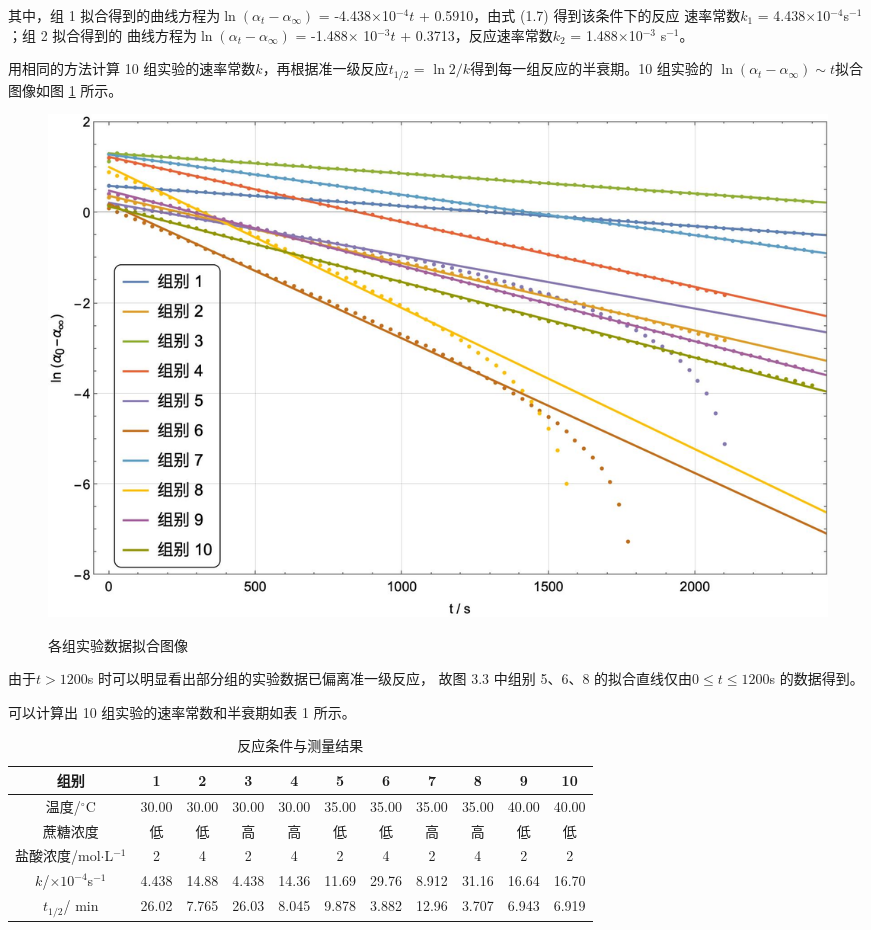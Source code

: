 \documentclass[12pt]{ctexart}
\numberwithin{equation}{section}
\begin{document}
其中，组 1 拟合得到的曲线方程为$\ln(\alpha_t-\alpha_{\infty})$ =
-4.438$\times$10$^{−4}t$ + 0.5910，由式 (1.7) 得到该条件下的反应
速率常数$k_1$ = 4.438$\times$10$^{−4}$s$^{-1}$；组 2 拟合得到的
曲线方程为$\ln(\alpha_t-\alpha_{\infty})$ = -1.488$\times$
10$^{-3}t$ + 0.3713，反应速率常数$k_2$ = 1.488$\times$10$^{-3}$
s$^{-1}$。

用相同的方法计算 10 组实验的速率常数$k$，再根据准一级反应$t_{1/2}$
= $\ln 2/k$得到每一组反应的半衰期。10 组实验的
$\ln(\alpha_t-\alpha_{\infty}) \sim t$拟合图像如图 \ref*{fig:inone} 所示。

\begin{figure}[!h]
    \centering
    \includegraphics[scale=0.50]{inone.jpg}
    \label{fig:inone}
    \caption{各组实验数据拟合图像}
\end{figure}

\newpage
由于$t > 1200$s 时可以明显看出部分组的实验数据已偏离准一级反应，
故图 3.3 中组别 5、6、8 的拟合直线仅由$0 \le t \le 1200$s 的数据得到。

可以计算出 10 组实验的速率常数和半衰期如表 1 所示。

\begin{longtable}{|c|cccccccccc|}
    \caption{反应条件与测量结果} \\
    \hline
    组别 & 1 & 2 & 3 & 4 & 5 & 6 & 7 & 8 & 9 & 10\\
    \hline
    温度/$^\circ$C & 30.00 & 30.00 & 30.00 & 30.00 & 35.00 & 35.00 & 35.00 & 35.00 & 40.00 & 40.00 \\
    蔗糖浓度 & 低 & 低 & 高 & 高 & 低 & 低 & 高 & 高 & 低 & 低 \\
    盐酸浓度/mol$\cdot$L$^{-1}$ & 2 & 4 & 2 & 4 & 2 & 4 & 2 & 4 & 2 & 2 \\
    $k$/$\times 10^{-4}$s$^{-1}$ & 4.438 & 14.88 & 4.438 & 14.36 & 11.69 & 29.76 & 8.912 & 31.16 & 16.64 & 16.70 \\
    $t_{1/2}$/ min & 26.02 & 7.765 & 26.03 & 8.045 & 9.878 & 3.882 & 12.96 & 3.707 & 6.943 & 6.919 \\
    \hline
\end{longtable}
\end{document}

